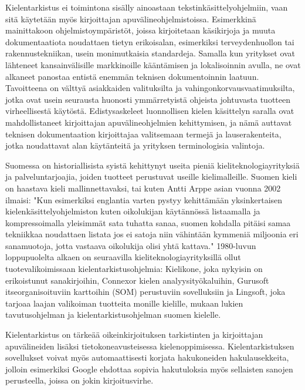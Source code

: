 \documentclass[]{../../metanetpaper}
\begin{document}
\begin{Parallel}[c]{77mm}{77mm}
{%

Kielentarkistus ei toimintona sisälly ainoastaan
tekstinkäsittelyohjelmiin, vaan sitä käytetään myös kirjoittajan
apuvälineohjelmistoissa. Esimerkkinä mainittakoon
ohjelmistoympäristöt, joissa kirjoitetaan käsikirjoja ja muuta
dokumentaatiota noudattaen tietyn erikoisalan, esimerkiksi
terveydenhuollon tai rakennustekniikan, usein monimutkaisia
standardeja. Samalla kun yritykset ovat lähteneet kansainvälisille
markkinoille kääntämisen ja lokalisoinnin avulla, ne ovat alkaneet
panostaa entistä enemmän teknisen dokumentoinnin laatuun.  Tavoitteena
on välttyä asiakkaiden valituksilta ja vahingonkorvausvaatimuksilta,
jotka ovat usein seurausta huonosti ymmärretyistä ohjeista johtuvasta
tuotteen virheellisestä käytöstä. Edistysaskeleet luonnollisen kielen
käsittelyn saralla ovat mahdollistaneet kirjoittajan
apuvälineohjelmien kehittymisen, ja nämä auttavat teknisen
dokumentaation kirjoittajaa valitsemaan termejä ja lauserakenteita,
jotka noudattavat alan käytänteitä ja yrityksen terminologisia
valintoja.

Suomessa on historiallisista syistä kehittynyt useita pieniä
kieliteknologiayrityksiä ja palveluntarjoajia, joiden tuotteet
perustuvat useille kielimalleille. Suomen kieli on haastava kieli
mallinnettavaksi, tai kuten Antti Arppe asian vuonna 2002 ilmaisi:
"Kun esimerkiksi englantia varten pystyy kehittämään yksinkertaisen
kielenkäsittelyohjelmiston kuten oikolukijan käytännössä listaamalla
ja kompressoimalla yleisimmät sata tuhatta sanaa, suomen kohdalla
pitäisi samaa tekniikkaa noudattaen listata jos ei satoja niin
vähintään kymmeniä miljoonia eri sanamuotoja, jotta vastaava
oikolukija olisi yhtä kattava." \cite{EiPolkua} 1980-luvun
loppupuolelta alkaen on seuraavilla kieliteknologiayrityksillä ollut
tuotevalikoimissaan kielentarkistusohjelmia: Kielikone, joka nykyisin
on erikoistunut sanakirjoihin, Connexor kielen analyysityökaluihin,
Gurusoft itseorganisoituviin karttoihin (SOM) perustuviin sovelluksiin
ja Lingsoft, joka tarjoaa laajan valikoiman tuotteita monille
kielille, mukaan lukien tavutusohjelman ja kielentarkistusohjelman
suomen kielelle.

Kielentarkistus on tärkeää oikeinkirjoituksen tarkistinten ja
kirjoittajan apuvälineiden lisäksi tietokoneavusteisessa
kielenoppimisessa.  Kielentarkistuksen sovellukset voivat myös
automaattisesti korjata hakukoneiden hakulausekkeita, jolloin
esimerkiksi Google ehdottaa sopivia hakutuloksia myös sellaisten
sanojen perusteella, joissa on jokin kirjoitusvirhe.
}


\end{Parallel}
\end{document}
